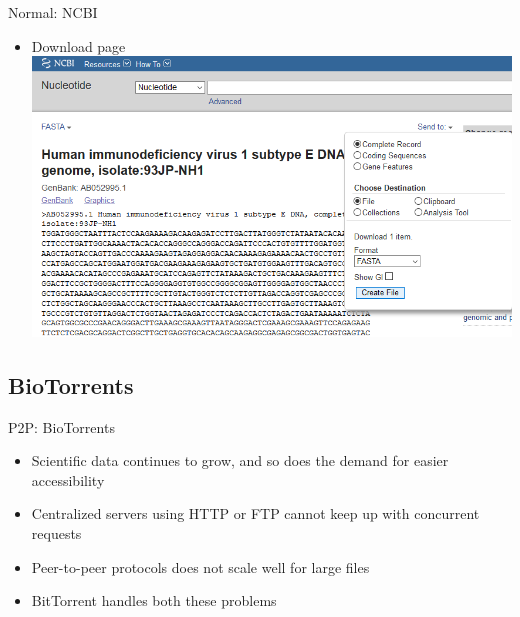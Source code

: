 \documentclass{beamer}
\begin{document}
    \begin{frame}{Normal: NCBI}
        \begin{itemize}
            \item Download page
            \includegraphics[scale=0.5]{ncbi3.png}
        \end{itemize}
    \end{frame}
    
    
        \subsection{BioTorrents}
    \begin{frame}{P2P: BioTorrents}
        \begin{itemize}
            \item Scientific data continues to grow, and so does the demand for easier accessibility
            \item Centralized servers using HTTP or FTP cannot keep up with concurrent requests
            \item Peer-to-peer protocols does not scale well for large files
            \item BitTorrent handles both these problems
        \end{itemize}
    \end{frame}
    
\end{document}
